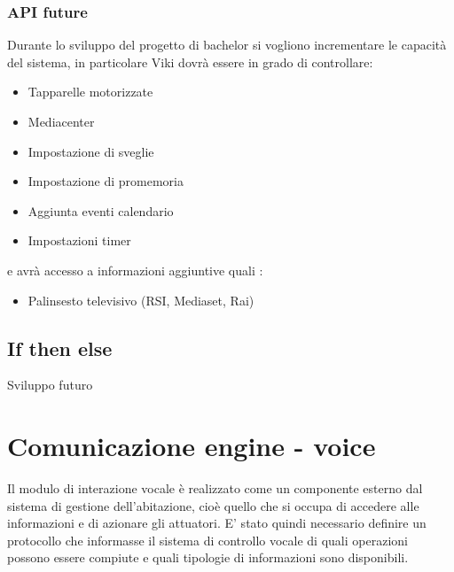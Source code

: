 \documentclass[twoside]{supsistudent}
\begin{document}
\subsection{API future}
Durante lo sviluppo del progetto di bachelor si vogliono incrementare le capacità del sistema, in particolare Viki dovrà essere in grado di controllare:
\begin{itemize}
  \item Tapparelle motorizzate
  \item Mediacenter
  \item Impostazione di sveglie
  \item Impostazione di promemoria
  \item Aggiunta eventi calendario
  \item Impostazioni timer
\end{itemize}
e avrà accesso a informazioni aggiuntive quali :
\begin{itemize}
  \item Palinsesto televisivo (RSI, Mediaset, Rai)
\end{itemize}

\section{If then else}
Sviluppo futuro

\chapter{Comunicazione engine - voice }
Il modulo di interazione vocale è realizzato come un componente esterno dal sistema di gestione dell'abitazione, cioè quello che si occupa di accedere alle informazioni e di azionare gli attuatori. E' stato quindi necessario definire un protocollo che informasse il sistema di controllo vocale di quali operazioni possono essere compiute e quali tipologie di informazioni sono disponibili.
\end{document}
